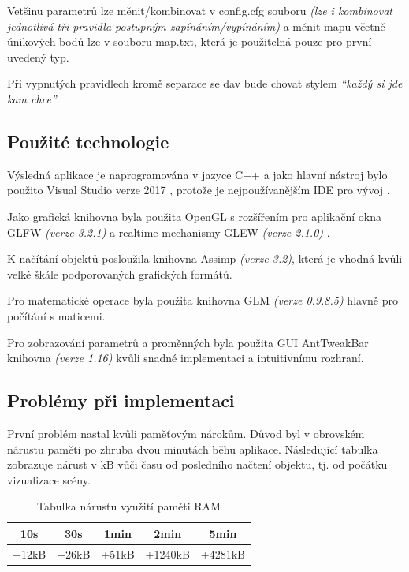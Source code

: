 \documentclass[czech,public,dept460,male,cpdeclaration]{diploma}
\begin{document}
Vetšinu parametrů lze měnit/kombinovat v config.cfg souboru \textit{(lze i kombinovat jednotlivá tři pravidla postupným zapínáním/vypínáním)} a měnit mapu včetně únikových bodů lze v souboru map.txt, která je použitelná pouze pro první uvedený typ.

Při vypnutých pravidlech kromě separace se dav bude chovat stylem \textit{``každý si jde kam chce''}.

\subsection{Použité technologie}
Výsledná aplikace je naprogramována v jazyce C++ a jako hlavní nástroj bylo použito Visual Studio verze 2017 \cite{linkToVisualStudio}, protože je nejpoužívanějším IDE pro vývoj \cite{linkToTopIDE}. 

Jako grafická knihovna byla použita OpenGL \cite{linkToOpenGL} s rozšířením pro aplikační okna GLFW \textit{(verze 3.2.1)} \cite{linkToGLFW} a realtime mechanismy GLEW \textit{(verze 2.1.0)} \cite{linkToGLew}.

K načítání objektů posloužila knihovna Assimp \cite{linkToAssimp} \textit{(verze 3.2)}, která je vhodná kvůli velké škále podporovaných grafických formátů.

Pro matematické operace byla použita knihovna GLM \cite{linkToGLM} \textit{(verze 0.9.8.5)} hlavně pro počítání s maticemi.

Pro zobrazování parametrů a proměnných byla použita GUI AntTweakBar knihovna \textit{(verze 1.16)} \cite{linkToAntTweakBar} kvůli snadné implementaci a intuitivnímu rozhraní.

\subsection{Problémy při implementaci}\label{sec:problemy-pri-implementaci}

První problém nastal kvůli paměťovým nárokům. Důvod byl v obrovském nárustu paměti po zhruba dvou minutách běhu aplikace. Následující tabulka zobrazuje nárust v kB vůči času od posledního načtení objektu, tj. od počátku vizualizace scény.

\begin{table}[H]
	\centering
	\caption{Tabulka nárustu využití paměti RAM}
	\label{tab:ramoptimalization}
	\renewcommand{\arraystretch}{1.5}
	\begin{tabular}{| c | c | c | c | c |}
		\hline
		10s & 30s & 1min & 2min & 5min\\\hline
		+12kB & +26kB & +51kB & +1240kB & +4281kB\\
		\hline
	\end{tabular}
\end{table}
\end{document}
